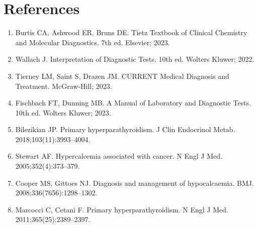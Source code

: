 \section*{References}
\begin{enumerate}
  \item Burtis CA, Ashwood ER, Bruns DE. Tietz Textbook of Clinical Chemistry and Molecular Diagnostics. 7th ed. Elsevier; 2023.
  \item Wallach J. Interpretation of Diagnostic Tests. 10th ed. Wolters Kluwer; 2022.
  \item Tierney LM, Saint S, Drazen JM. CURRENT Medical Diagnosis and Treatment. McGraw-Hill; 2023.
  \item Fischbach FT, Dunning MB. A Manual of Laboratory and Diagnostic Tests. 10th ed. Wolters Kluwer; 2023.
  \item Bilezikian JP. Primary hyperparathyroidism. J Clin Endocrinol Metab. 2018;103(11):3993--4004.
  \item Stewart AF. Hypercalcemia associated with cancer. N Engl J Med. 2005;352(4):373--379.
  \item Cooper MS, Gittoes NJ. Diagnosis and management of hypocalcaemia. BMJ. 2008;336(7656):1298--1302.
  \item Marcocci C, Cetani F. Primary hyperparathyroidism. N Engl J Med. 2011;365(25):2389--2397.
\end{enumerate}

\clearpage
